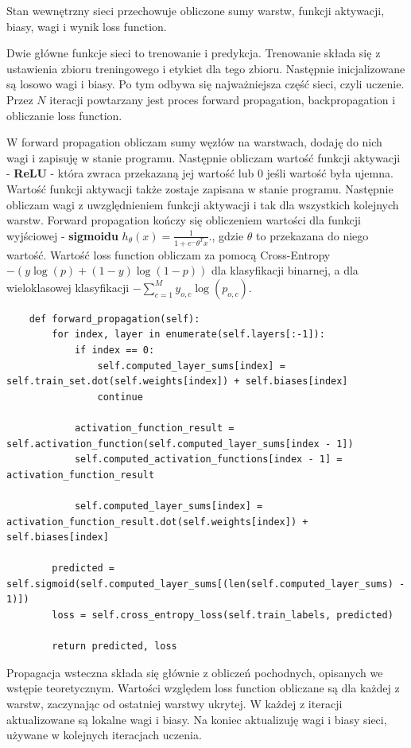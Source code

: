 \documentclass[12pt]{article}
\begin{document}
Stan wewnętrzny sieci przechowuje obliczone sumy warstw, funkcji aktywacji, biasy, wagi i wynik loss function.

Dwie główne funkcje sieci to trenowanie i predykcja. Trenowanie składa się z ustawienia zbioru treningowego i etykiet dla tego zbioru. Następnie inicjalizowane są losowo wagi i biasy. Po tym odbywa się najważniejsza część sieci, czyli uczenie. Przez $N$ iteracji powtarzany jest proces forward propagation, backpropagation i obliczanie loss function.

W forward propagation obliczam sumy węzłów na warstwach, dodaję do nich wagi i zapisuję w stanie programu. Następnie obliczam wartość funkcji aktywacji - \textbf{ReLU} - która zwraca przekazaną jej wartość lub $0$ jeśli wartość była ujemna. Wartość funkcji aktywacji także zostaje zapisana w stanie programu. Następnie obliczam wagi z uwzględnieniem funkcji aktywacji i tak dla wszystkich kolejnych warstw. Forward propagation kończy się obliczeniem wartości dla funkcji wyjściowej - \textbf{sigmoidu} $ h_ \theta (x) =  \frac{\mathrm{1} }{\mathrm{1} + e^- \theta^Tx }  $., gdzie $\theta$ to przekazana do niego wartość. Wartość loss function obliczam za pomocą Cross-Entropy $-{(y\log(p) + (1 - y)\log(1 - p))}$ dla klasyfikacji binarnej, a dla wieloklasowej klasyfikacji $
-\sum_{c=1}^My_{o,c}\log(p_{o,c})$.

\noindent
    \begin{verbatim}
    def forward_propagation(self):
        for index, layer in enumerate(self.layers[:-1]):
            if index == 0:
                self.computed_layer_sums[index] = self.train_set.dot(self.weights[index]) + self.biases[index]
                continue

            activation_function_result = self.activation_function(self.computed_layer_sums[index - 1])
            self.computed_activation_functions[index - 1] = activation_function_result

            self.computed_layer_sums[index] = activation_function_result.dot(self.weights[index]) + self.biases[index]

        predicted = self.sigmoid(self.computed_layer_sums[(len(self.computed_layer_sums) - 1)])
        loss = self.cross_entropy_loss(self.train_labels, predicted)

        return predicted, loss
    \end{verbatim}

\noindent

Propagacja wsteczna składa się głównie z obliczeń pochodnych, opisanych we wstępie teoretycznym. Wartości względem loss function obliczane są dla każdej z warstw, zaczynając od ostatniej warstwy ukrytej. W każdej z iteracji aktualizowane są lokalne wagi i biasy. Na koniec aktualizuję wagi i biasy sieci, używane w kolejnych iteracjach uczenia.
\end{document}
